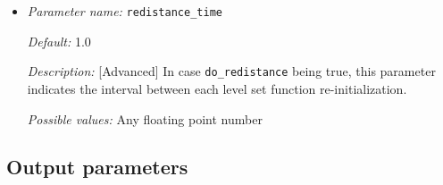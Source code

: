 \begin{itemize}
\item {\it Parameter name:} {\tt redistance\_time}
\label{parameters:redistance_time}


{\it Default:} 1.0

{\it Description:} [Advanced] In case {\tt do\_redistance} being true, this parameter indicates the interval between each level set function re-initialization.

{\it Possible values:} Any floating point number

\end{itemize}


\subsection{Output parameters}
\label{parameters:output}


